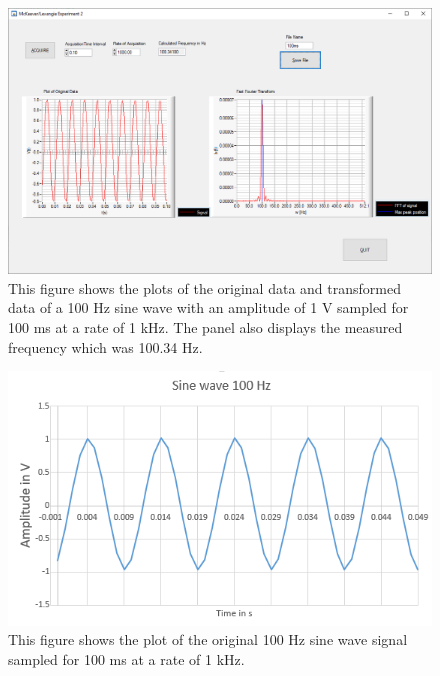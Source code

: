 \documentclass{article}
\begin{document}
\begin{figure}[H]
\includegraphics[scale=0.5,center]{Sine100ms.png}
\caption{This figure shows the plots of the original data and transformed data of a 100 Hz sine wave with an amplitude of 1 V sampled for 100 ms at a rate of 1 kHz.  The panel also displays the measured frequency which was 100.34 Hz.}
\end{figure}

\begin{figure}[H]
\includegraphics[scale=.6,center]{Sine50msex.PNG}
\caption{This figure shows the plot of the original 100 Hz sine wave signal sampled for 100 ms at a rate of 1 kHz.}
\end{figure}
\end{document}
